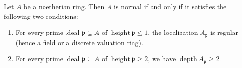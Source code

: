 Let $A$ be a noetherian ring. Then $A$ is normal if and only if it satisfies the following two conditions:

\begin{enumerate}
\item[(1)] For every prime ideal $\mathfrak{p} \subseteq A$ of $\operatorname{height} \mathfrak{p} \leqslant 1$, the localization $A_\mathfrak{p}$ is regular (hence a field or a discrete valuation ring).
\item[(2)] For every prime ideal $\mathfrak{p} \subseteq A$ of $\operatorname{height} \mathfrak{p} \geqslant 2$, we have $\operatorname{depth} A_\mathfrak{p} \geqslant 2$.
\end{enumerate}
